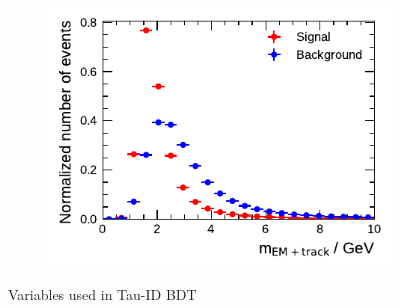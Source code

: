 \begin{figure}[!ht]
\begin{subfigure}{0.5\textwidth}
  \end{subfigure}%
  \begin{subfigure}{0.5\textwidth}
    \centering
    \includegraphics{./figures/baseline_bdt_vars/3p/mEflowApprox.pdf}
  \end{subfigure}
  \caption[]{Variables used in Tau-ID BDT}
\end{figure}


